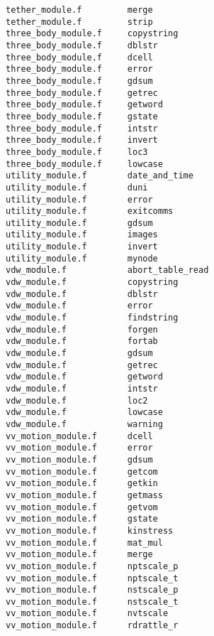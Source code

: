 \begin{verbatim}
tether_module.f         merge                     
tether_module.f         strip
three_body_module.f     copystring                
three_body_module.f     dblstr                    
three_body_module.f     dcell                     
three_body_module.f     error                     
three_body_module.f     gdsum                     
three_body_module.f     getrec                    
three_body_module.f     getword                   
three_body_module.f     gstate                    
three_body_module.f     intstr                    
three_body_module.f     invert                    
three_body_module.f     loc3                      
three_body_module.f     lowcase                   
utility_module.f        date_and_time             
utility_module.f        duni                      
utility_module.f        error                     
utility_module.f        exitcomms                 
utility_module.f        gdsum                     
utility_module.f        images                    
utility_module.f        invert                    
utility_module.f        mynode                    
vdw_module.f            abort_table_read          
vdw_module.f            copystring                
vdw_module.f            dblstr                    
vdw_module.f            error                     
vdw_module.f            findstring
vdw_module.f            forgen
vdw_module.f            fortab
vdw_module.f            gdsum                     
vdw_module.f            getrec                    
vdw_module.f            getword                   
vdw_module.f            intstr                    
vdw_module.f            loc2                      
vdw_module.f            lowcase                   
vdw_module.f            warning                   
vv_motion_module.f      dcell                     
vv_motion_module.f      error                     
vv_motion_module.f      gdsum                     
vv_motion_module.f      getcom                    
vv_motion_module.f      getkin                    
vv_motion_module.f      getmass                   
vv_motion_module.f      getvom                    
vv_motion_module.f      gstate                    
vv_motion_module.f      kinstress                 
vv_motion_module.f      mat_mul                   
vv_motion_module.f      merge                     
vv_motion_module.f      nptscale_p                
vv_motion_module.f      nptscale_t                
vv_motion_module.f      nstscale_p                
vv_motion_module.f      nstscale_t                
vv_motion_module.f      nvtscale                  
vv_motion_module.f      rdrattle_r                

\end{verbatim}
